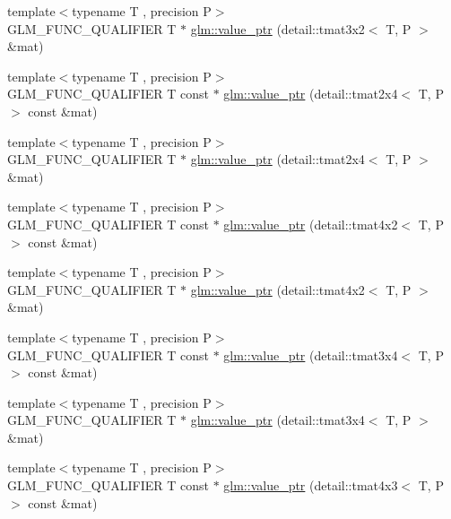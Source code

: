 \begin{DoxyCompactItemize}
\item 
{\footnotesize template$<$typename T , precision P$>$ }\\G\-L\-M\-\_\-\-F\-U\-N\-C\-\_\-\-Q\-U\-A\-L\-I\-F\-I\-E\-R T $\ast$ \hyperlink{group__gtc__type__ptr_gae2e604002202417c7156db3deeb1301d}{glm\-::value\-\_\-ptr} (detail\-::tmat3x2$<$ T, P $>$ \&mat)
\item 
{\footnotesize template$<$typename T , precision P$>$ }\\G\-L\-M\-\_\-\-F\-U\-N\-C\-\_\-\-Q\-U\-A\-L\-I\-F\-I\-E\-R T const $\ast$ \hyperlink{group__gtc__type__ptr_ga7b738eac576043c00c39bda2fc515d7b}{glm\-::value\-\_\-ptr} (detail\-::tmat2x4$<$ T, P $>$ const \&mat)
\item 
{\footnotesize template$<$typename T , precision P$>$ }\\G\-L\-M\-\_\-\-F\-U\-N\-C\-\_\-\-Q\-U\-A\-L\-I\-F\-I\-E\-R T $\ast$ \hyperlink{group__gtc__type__ptr_ga59b17271f4f487e556383b715f9b8534}{glm\-::value\-\_\-ptr} (detail\-::tmat2x4$<$ T, P $>$ \&mat)
\item 
{\footnotesize template$<$typename T , precision P$>$ }\\G\-L\-M\-\_\-\-F\-U\-N\-C\-\_\-\-Q\-U\-A\-L\-I\-F\-I\-E\-R T const $\ast$ \hyperlink{group__gtc__type__ptr_ga73acc0dbfeeb9e6c09df1f79fd990b84}{glm\-::value\-\_\-ptr} (detail\-::tmat4x2$<$ T, P $>$ const \&mat)
\item 
{\footnotesize template$<$typename T , precision P$>$ }\\G\-L\-M\-\_\-\-F\-U\-N\-C\-\_\-\-Q\-U\-A\-L\-I\-F\-I\-E\-R T $\ast$ \hyperlink{group__gtc__type__ptr_ga478c7dc470b36836ac5392e852fd2348}{glm\-::value\-\_\-ptr} (detail\-::tmat4x2$<$ T, P $>$ \&mat)
\item 
{\footnotesize template$<$typename T , precision P$>$ }\\G\-L\-M\-\_\-\-F\-U\-N\-C\-\_\-\-Q\-U\-A\-L\-I\-F\-I\-E\-R T const $\ast$ \hyperlink{group__gtc__type__ptr_ga233effe326542ae9657b8feac80e541f}{glm\-::value\-\_\-ptr} (detail\-::tmat3x4$<$ T, P $>$ const \&mat)
\item 
{\footnotesize template$<$typename T , precision P$>$ }\\G\-L\-M\-\_\-\-F\-U\-N\-C\-\_\-\-Q\-U\-A\-L\-I\-F\-I\-E\-R T $\ast$ \hyperlink{group__gtc__type__ptr_gad8c6b1dbda2b48d19fd1bc8b01cf701c}{glm\-::value\-\_\-ptr} (detail\-::tmat3x4$<$ T, P $>$ \&mat)
\item 
{\footnotesize template$<$typename T , precision P$>$ }\\G\-L\-M\-\_\-\-F\-U\-N\-C\-\_\-\-Q\-U\-A\-L\-I\-F\-I\-E\-R T const $\ast$ \hyperlink{group__gtc__type__ptr_gaebe5b66d8b05f6ace85d26cedd03732d}{glm\-::value\-\_\-ptr} (detail\-::tmat4x3$<$ T, P $>$ const \&mat)

\end{DoxyCompactItemize}
